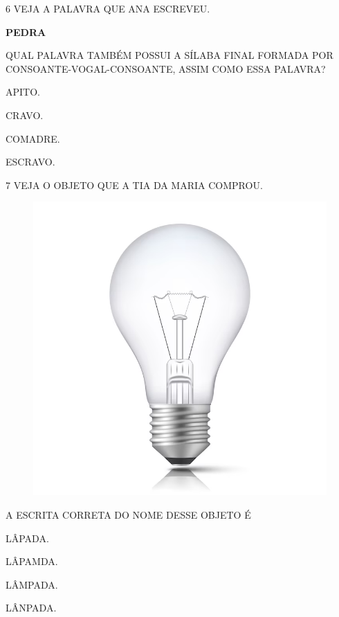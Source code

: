 \num{6} VEJA A PALAVRA QUE ANA ESCREVEU.

\begin{center}
\textbf{PEDRA}
\end{center}

QUAL PALAVRA TAMBÉM POSSUI A SÍLABA FINAL FORMADA POR CONSOANTE-VOGAL-CONSOANTE, ASSIM COMO ESSA PALAVRA?

\begin{escolha}

\item APITO.

\item CRAVO.

\item COMADRE. 

\item ESCRAVO.

\end{escolha}

\num{7} VEJA O OBJETO QUE A TIA DA MARIA COMPROU.

\begin{figure}[H]
\centering
\includegraphics[width=.6\textwidth]{./media/image240.png}
\end{figure}

A ESCRITA CORRETA DO NOME DESSE OBJETO É

\begin{escolha}

\item LÂPADA.

\item LÂPAMDA.

\item LÂMPADA.

\item LÂNPADA.

\end{escolha}

